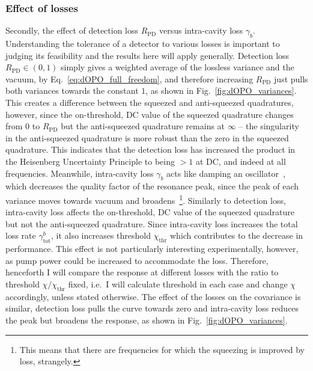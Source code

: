 \subsubsection{Effect of losses}

Secondly, the effect of detection loss $R_\text{PD}$ versus intra-cavity loss $\gamma_b$. Understanding the tolerance of a detector to various losses is important to judging its feasibility and the results here will apply generally. Detection loss $R_\text{PD}\in(0,1)$ simply gives a weighted average of the lossless variance and the vacuum, by Eq.~\ref{eq:dOPO_full_freedom}, and therefore increasing $R_\text{PD}$ just pulls both variances towards the constant $1$, as shown in Fig.~\ref{fig:dOPO_variances}. This creates a difference between the squeezed and anti-squeezed quadratures, however, since the on-threshold, DC value of the squeezed quadrature changes from $0$ to $R_\text{PD}$ but the anti-squeezed quadrature remains at $\infty$ -- the singularity in the anti-squeezed quadrature is more robust than the zero in the squeezed quadrature. This indicates that the detection loss has increased the product in the Heisenberg Uncertainty Principle to being $>1$ at DC, and indeed at all  frequencies. Meanwhile, intra-cavity loss $\gamma_b$ acts like damping an oscillator~\cite{}, which decreases the quality factor of the resonance peak, since the peak of each variance moves towards vacuum and broadens~\footnote{This means that there are frequencies for which the squeezing is improved by loss, strangely.}. Similarly to detection loss, intra-cavity loss affects the on-threshold, DC value of the squeezed quadrature but not the anti-squeezed quadrature. Since intra-cavity loss increases the total loss rate $\gamma^b_\text{tot}$, it also increases threshold $\chi_\text{thr}$ which contributes to the decrease in performance. This effect is not particularly interesting experimentally, however, as pump power could be increased to accommodate the loss. Therefore, henceforth I will compare the response at different losses with the ratio to threshold $\chi/\chi_\text{thr}$ fixed, i.e.\ I will calculate threshold in each case and change $\chi$ accordingly, unless stated otherwise. 
The effect of the losses on the covariance is similar, detection loss pulls the curve towards zero and intra-cavity loss reduces the peak but broadens the response, as shown in Fig.~\ref{fig:dOPO_variances}.

